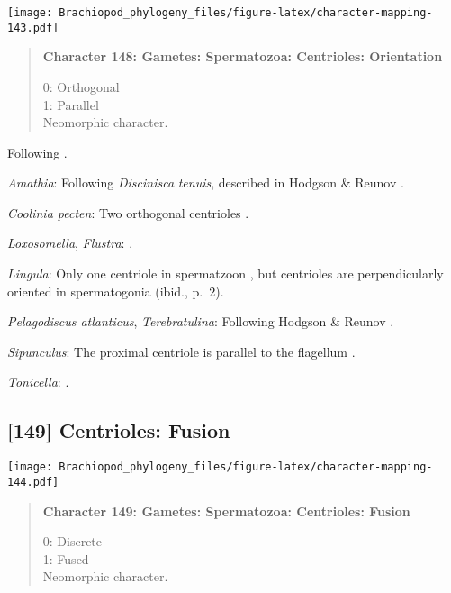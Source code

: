 \documentclass[openany]{book}
\theoremstyle{definition}
\theoremstyle{definition}
\theoremstyle{definition}
\theoremstyle{remark}
\begin{document}
\texttt{[image: Brachiopod\_phylogeny\_files/figure-latex/character-mapping-143.pdf]}

\begin{quote}
\textbf{Character 148: Gametes: Spermatozoa: Centrioles: Orientation}

0: Orthogonal\\
1: Parallel\\
Neomorphic character.
\end{quote}

Following \citet{Hodgson1994Ultrastructureof}.

\hypertarget{Amathia-coding-148}{}
\emph{Amathia}: Following \emph{Discinisca} \emph{tenuis}, described in
Hodgson \& Reunov \citeyearpar{Hodgson1994Ultrastructureof}.

\hypertarget{Coolinia_pecten-coding-148}{}
\emph{Coolinia pecten}: Two orthogonal centrioles
\citep{Afzelius1978Finestructure}.

\hypertarget{Flustra-coding-148}{}
\emph{Loxosomella}, \emph{Flustra}: \citep{Franzen1981}.

\hypertarget{Lingula-coding-148}{}
\emph{Lingula}: Only one centriole in spermatzoon
\citep[p.~7]{Reunov2004Ultrastructuralstudy}, but centrioles are
perpendicularly oriented in spermatogonia (ibid., p.~2).

\hypertarget{Pelagodiscus_atlanticus-coding-148}{}
\emph{Pelagodiscus atlanticus}, \emph{Terebratulina}: Following Hodgson
\& Reunov \citeyearpar{Hodgson1994Ultrastructureof}.

\hypertarget{Sipunculus-coding-148}{}
\emph{Sipunculus}: The proximal centriole is parallel to the flagellum
\citep{Gherardi2011}.

\hypertarget{Tonicella-coding-148}{}
\emph{Tonicella}: \citet{DufresneDube1983}.

\subsection*{{[}149{]} Centrioles: Fusion}\label{centrioles-fusion}

\texttt{[image: Brachiopod\_phylogeny\_files/figure-latex/character-mapping-144.pdf]}

\begin{quote}
\textbf{Character 149: Gametes: Spermatozoa: Centrioles: Fusion}

0: Discrete\\
1: Fused\\
Neomorphic character.
\end{quote}
\end{document}
